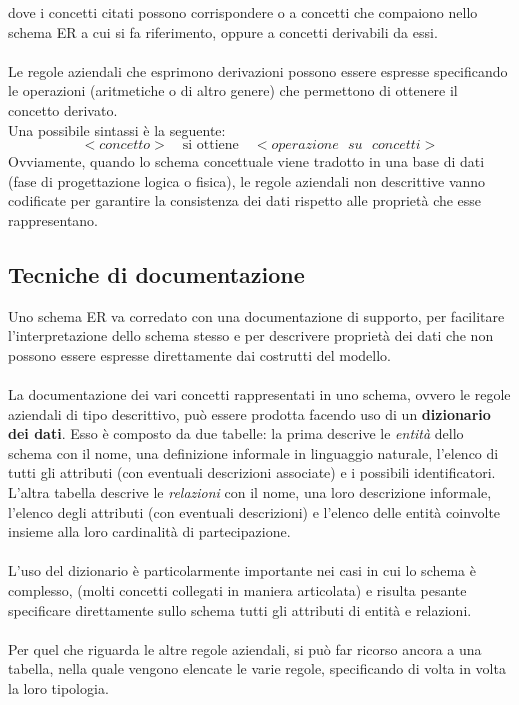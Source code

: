 dove i concetti citati possono corrispondere o a concetti che compaiono nello schema ER a cui si fa riferimento, oppure a concetti derivabili da essi.\\\\
Le regole aziendali che esprimono derivazioni possono essere espresse specificando le operazioni (aritmetiche o di altro genere) che permettono di ottenere il concetto derivato.\\
Una possibile sintassi è la seguente:
    \begin{equation}
        <concetto> \quad \text{si ottiene} \quad <operazione \text{ } su \text{ } concetti>
    \end{equation}
Ovviamente, quando lo schema concettuale viene tradotto in una base di dati (fase di progettazione logica o fisica),  le regole aziendali non descrittive vanno codificate per garantire la consistenza dei dati rispetto alle proprietà che esse rappresentano.

\subsection{Tecniche di documentazione}
Uno schema ER va corredato con una documentazione di supporto, per facilitare l'interpretazione dello schema stesso e per descrivere proprietà dei dati che non possono essere espresse direttamente dai costrutti del modello.\\\\
La documentazione dei vari concetti rappresentati in uno schema, ovvero le regole aziendali di tipo descrittivo, può essere prodotta facendo uso di un \textbf{dizionario dei dati}. Esso è composto da due tabelle: la prima descrive le \textit{entità} dello schema con il nome, una definizione informale in linguaggio naturale, l'elenco di tutti gli attributi (con eventuali descrizioni associate) e i possibili identificatori.\\
L'altra tabella descrive le \textit{relazioni} con il nome, una loro descrizione informale, l'elenco degli attributi (con eventuali descrizioni) e l'elenco delle entità coinvolte insieme alla loro cardinalità di partecipazione.\\\\
L'uso del dizionario è particolarmente importante nei casi in cui lo schema è complesso, (molti concetti collegati in maniera articolata) e risulta pesante specificare direttamente sullo schema tutti gli attributi di entità e relazioni.\\\\
Per quel che riguarda le altre regole aziendali, si può far ricorso ancora a una tabella, nella quale vengono elencate le varie regole, specificando di volta in volta la loro tipologia.